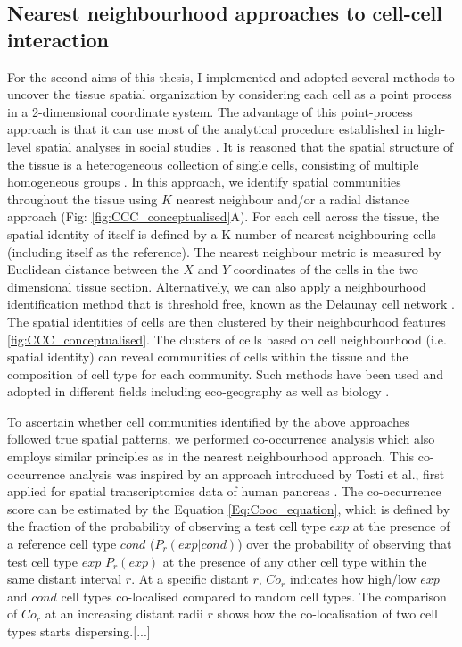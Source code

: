 \subsection{Nearest neighbourhood approaches to cell-cell interaction}
For the second aims of this thesis, I implemented and adopted several methods to uncover the tissue spatial organization by considering each cell as a point process in a 2-dimensional coordinate system. The advantage of this point-process approach is that it can use most of the analytical procedure established in high-level spatial analyses in social studies \cite{yushimito2012voronoi}. It is reasoned that the spatial structure of the tissue is a heterogeneous collection of single cells, consisting of multiple homogeneous groups \cite{schurch2020coordinated}. In this approach, we identify spatial communities throughout the tissue using $K$ nearest neighbour and/or a radial distance approach (Fig: \ref{fig:CCC_conceptualised}A). For each cell across the tissue, the spatial identity of itself is defined by a K number of nearest neighbouring cells (including itself as the reference). The nearest neighbour metric is measured by Euclidean distance between the $X$ and $Y$ coordinates of the cells in the two dimensional tissue section. Alternatively, we can also apply a neighbourhood identification method that is threshold free, known as the Delaunay cell network \cite{guibas1985primitives, dries2021giotto}. The spatial identities of cells are then clustered by their neighbourhood features \ref{fig:CCC_conceptualised}. The clusters of cells based on cell neighbourhood (i.e. spatial identity) can reveal communities of cells within the tissue and the composition of cell type for each community. Such methods have been used and adopted in different fields including eco-geography as well as biology \cite{goltsev2018CODEX, dries2021giotto}.

To ascertain whether cell communities identified by the above approaches followed true spatial patterns, we performed co-occurrence analysis which also employs similar principles as in the nearest neighbourhood approach. This co-occurrence analysis was inspired by an approach introduced by Tosti et al., first applied for spatial transcriptomics data of human pancreas \cite{tosti2021single}. The co-occurrence score can be estimated by the Equation \ref{Eq:Cooc_equation}, which is defined by the fraction of the probability of observing a test cell type $exp$ at the presence of a reference cell type $cond$ ($P_{r}(exp|cond)$) over the probability of observing that test cell type $exp$ $P_{r}(exp)$ at the presence of any other cell type within the same distant interval $r$. At a specific distant $r$, $Co_{r}$ indicates how high/low $exp$ and $cond$ cell types co-localised compared to random cell types. The comparison of $Co_{r}$ at an increasing distant radii $r$ shows how the co-localisation of two cell types starts dispersing.[...]


